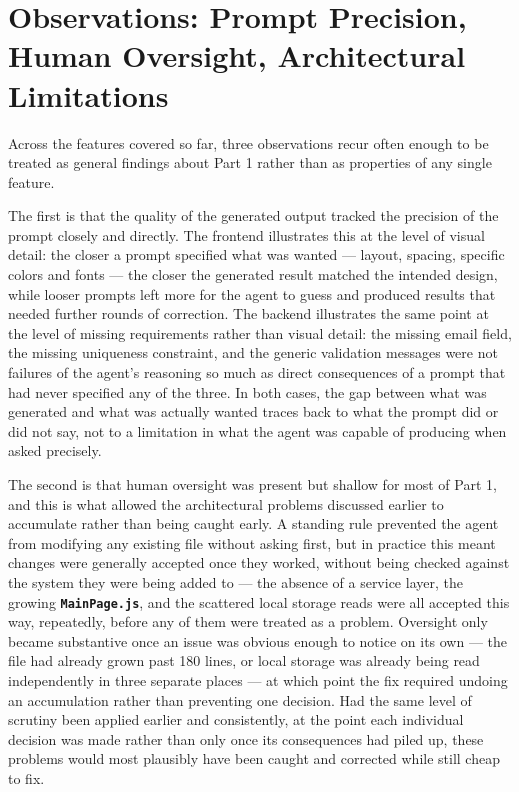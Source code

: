 \section{Observations: Prompt Precision, Human Oversight, Architectural Limitations}

Across the features covered so far, three observations recur often enough to be treated as general findings about Part 1 rather than as properties of any single feature.

The first is that the quality of the generated output tracked the precision of the prompt closely and directly. The frontend illustrates this at the level of visual detail: the closer a prompt specified what was wanted --- layout, spacing, specific colors and fonts --- the closer the generated result matched the intended design, while looser prompts left more for the agent to guess and produced results that needed further rounds of correction. The backend illustrates the same point at the level of missing requirements rather than visual detail: the missing email field, the missing uniqueness constraint, and the generic validation messages were not failures of the agent's reasoning so much as direct consequences of a prompt that had never specified any of the three. In both cases, the gap between what was generated and what was actually wanted traces back to what the prompt did or did not say, not to a limitation in what the agent was capable of producing when asked precisely.

The second is that human oversight was present but shallow for most of Part 1, and this is what allowed the architectural problems discussed earlier to accumulate rather than being caught early. A standing rule prevented the agent from modifying any existing file without asking first, but in practice this meant changes were generally accepted once they worked, without being checked against the system they were being added to --- the absence of a service layer, the growing \textbf{\texttt{MainPage.js}}, and the scattered local storage reads were all accepted this way, repeatedly, before any of them were treated as a problem. Oversight only became substantive once an issue was obvious enough to notice on its own --- the file had already grown past 180 lines, or local storage was already being read independently in three separate places --- at which point the fix required undoing an accumulation rather than preventing one decision. Had the same level of scrutiny been applied earlier and consistently, at the point each individual decision was made rather than only once its consequences had piled up, these problems would most plausibly have been caught and corrected while still cheap to fix.

